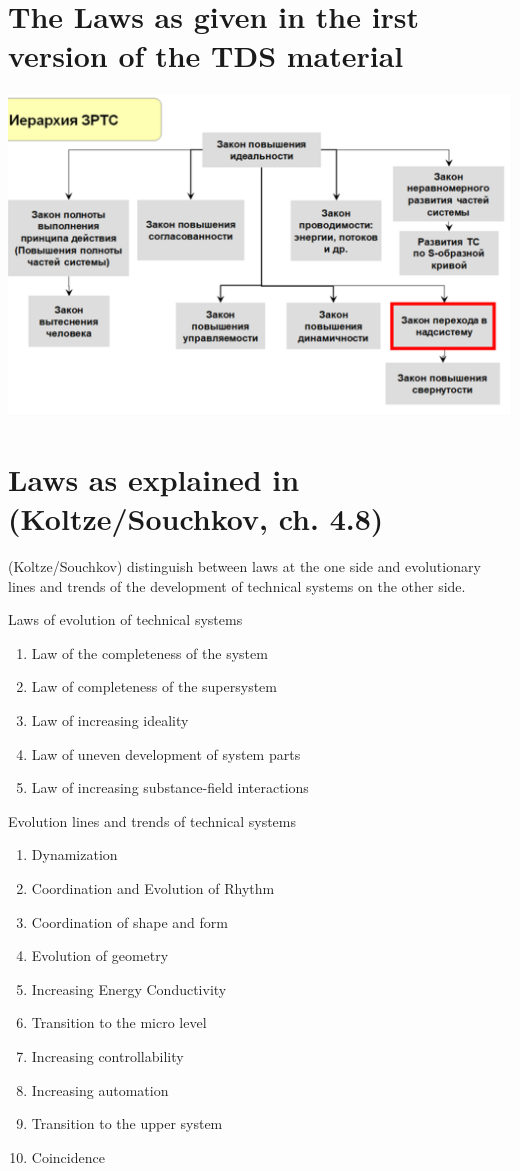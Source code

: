 \documentclass[11pt,a4paper]{article}
\begin{document}
\section*{The Laws as given in the irst version of the TDS material}

\begin{center}
  \includegraphics[width=.9\textwidth]{oE4yUs.png}
\end{center}

\section*{Laws as explained in (Koltze/Souchkov, ch. 4.8)}

(Koltze/Souchkov) distinguish between laws at the one side and evolutionary
lines and trends of the development of technical systems on the other side.

Laws of evolution of technical systems
\begin{enumerate}\itemsep0pt
\item Law of the completeness of the system
\item Law of completeness of the supersystem
\item Law of increasing ideality
\item Law of uneven development of system parts
\item Law of increasing substance-field interactions
\end{enumerate}

Evolution lines and trends of technical systems
\begin{enumerate}\itemsep0pt
\item Dynamization
\item Coordination and Evolution of Rhythm
\item Coordination of shape and form
\item Evolution of geometry
\item Increasing Energy Conductivity
\item Transition to the micro level
\item Increasing controllability
\item Increasing automation
\item Transition to the upper system
\item Coincidence
\end{enumerate}
\end{document}
